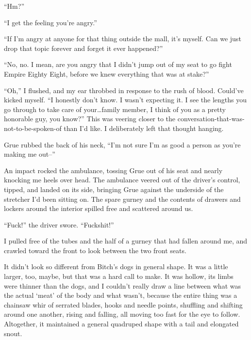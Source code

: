 ``Hm?''



``I get the feeling you're angry.''



``If I'm angry at anyone for that thing outside the mall, it's myself.  Can we just drop that topic forever and forget it ever happened?''



``No, no.  I mean, are you angry that I didn't jump out of my seat to go fight Empire Eighty Eight, before we knew everything that was at stake?''



``Oh,'' I flushed, and my ear throbbed in response to the rush of blood.  Could've kicked myself.  ``I honestly don't know.  I wasn't expecting it.  I see the lengths you go through to take care of your\ldots family member, I think of you as a pretty honorable guy, you know?''  This was veering closer to the conversation-that-was-not-to-be-spoken-of than I'd like.  I deliberately left that thought hanging.



Grue rubbed the back of his neck, ``I'm not sure I'm as good a person as you're making me out--''



An impact rocked the ambulance, tossing Grue out of his seat and nearly knocking me heels over head.  The ambulance veered out of the driver's control, tipped, and landed on its side, bringing Grue against the underside of the stretcher I'd been sitting on.  The spare gurney and the contents of drawers and lockers around the interior spilled free and scattered around us.



``Fuck!'' the driver swore.  ``Fuckshit!''



I pulled free of the tubes and the half of a gurney that had fallen around me, and crawled toward the front to look between the two front seats.



It didn't look so different from Bitch's dogs in general shape.  It was a little larger, too, maybe, but that was a hard call to make.  It was hollow, its limbs were thinner than the dogs, and I couldn't really draw a line between what was the actual `meat' of the body and what wasn't, because the entire thing was a chainsaw whir of serrated blades, hooks and needle points, shuffling and shifting around one another, rising and falling, all moving too fast for the eye to follow.  Altogether, it maintained a general quadruped shape with a tail and elongated snout.



